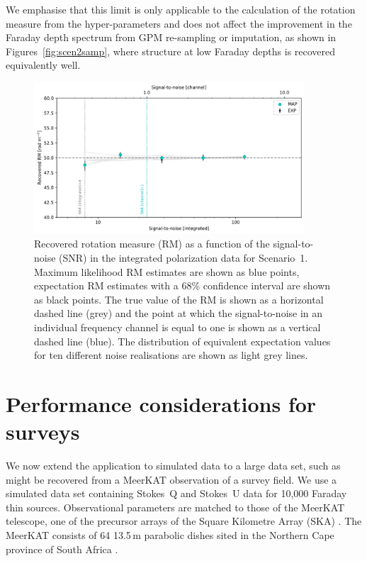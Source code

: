 \documentclass[fleqn,usenatbib]{mnras}
\begin{document}
We emphasise that this limit is only applicable to the calculation of the rotation measure from the hyper-parameters and does not affect the improvement in the Faraday depth spectrum from GPM re-sampling or imputation, as shown in Figures~\ref{fig:scen2samp}, where structure at low Faraday depths is recovered equivalently well.
%
\begin{figure}
\centerline{\includegraphics[width=0.9\textwidth]{./FIGURES/rm_snr.png}}
\caption{\label{fig:rm_snr} Recovered rotation measure (RM) as a function of the signal-to-noise (SNR) in the integrated polarization data for Scenario~1. Maximum likelihood RM estimates are shown as blue points, expectation RM estimates with a 68\% confidence interval are shown as black points. The true value of the RM is shown as a horizontal dashed line (grey) and the point at which the signal-to-noise in an individual frequency channel is equal to one is shown as a vertical dashed line (blue). The distribution of equivalent expectation values for ten different noise realisations are shown as light grey lines.}
\end{figure}



\section{Performance considerations for surveys}
\label{sec:joedata}

We now extend the application to simulated data to a large data set, such as might be recovered from a MeerKAT observation of a survey field. We use a simulated data set containing Stokes~Q and Stokes~U data for 10,000 Faraday thin sources. Observational parameters are matched to those of the MeerKAT telescope, one of the precursor arrays of the Square Kilometre Array (SKA) \citep{5136190, 2009IEEEP..97.1522J}. The MeerKAT consists of 64 13.5\,m parabolic dishes sited in the Northern Cape province of South Africa \citep{Justin,Taylor_2017}. %
\end{document}
